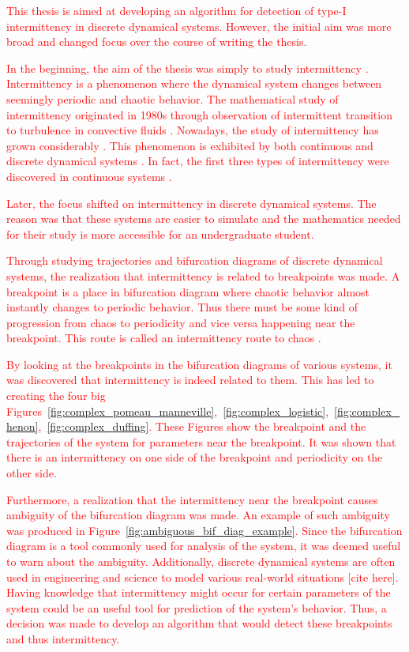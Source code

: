 \textcolor{red}{
This thesis is aimed at developing an algorithm for detection of type-I intermittency in discrete dynamical systems.
However, the initial aim was more broad and changed focus over the course of writing the thesis.
}
\par
\textcolor{red}{
In the beginning, the aim of the thesis was simply to study intermittency \cite{Elaskar2023}.
Intermittency is a phenomenon where the dynamical system changes between seemingly periodic and chaotic behavior.
The mathematical study of intermittency originated in 1980s through observation of intermittent transition to turbulence in convective fluids \cite{Pomeau1980}.
Nowadays, the study of intermittency has grown considerably \cite{Elaskar2017}.
This phenomenon is exhibited by both continuous and discrete dynamical systems \cite{Devaney20211026, Hirsch2013, Strogatz201854}.
In fact, the first three types of intermittency were discovered in continuous systems \cite{Manneville1980-2}.
}
\par
\textcolor{red}{
Later, the focus shifted on intermittency in discrete dynamical systems.
The reason was that these systems are easier to simulate and the mathematics needed for their study is more accessible for an undergraduate student.
}
\par
\textcolor{red}{
Through studying trajectories and bifurcation diagrams of discrete dynamical systems, the realization that intermittency is related to breakpoints was made.
A breakpoint is a place in bifurcation diagram where chaotic behavior almost instantly changes to periodic behavior.
Thus there must be some kind of progression from chaos to periodicity and vice versa happening near the breakpoint.
This route is called an intermittency route to chaos \cite{Strogatz201854}.
}
\par
\textcolor{red}{
By looking at the breakpoints in the bifurcation diagrams of various systems, it was discovered that intermittency is indeed related to them.
This has led to creating the four big Figures~\ref{fig:complex_pomeau_manneville},~\ref{fig:complex_logistic},~\ref{fig:complex_henon},~\ref{fig:complex_duffing}.
These Figures show the breakpoint and the trajectories of the system for parameters near the breakpoint.
It was shown that there is an intermittency on one side of the breakpoint and periodicity on the other side.
}
\par
\textcolor{red}{
Furthermore, a realization that the intermittency near the breakpoint causes ambiguity of the bifurcation diagram was made.
An example of such ambiguity was produced in Figure~\ref{fig:ambiguous_bif_diag_example}.
Since the bifurcation diagram is a tool commonly used for analysis of the system, it was deemed useful to warn about the ambiguity.
Additionally, discrete dynamical systems are often used in engineering and science to model various real-world situations [cite here].
Having knowledge that intermittency might occur for certain parameters of the system could be an useful tool for prediction of the system's behavior.
Thus, a decision was made to develop an algorithm that would detect these breakpoints and thus intermittency.
}
